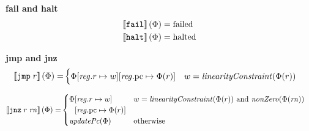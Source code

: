 \documentclass[a4paper]{article}
\begin{document}
\noindent\textbf{fail and halt}\\
\begin{align*}
  \left\llbracket \texttt{{\color{black} fail}} \right\rrbracket(\Phi) = & \; \mathrm{failed} \\
  \left\llbracket \texttt{{\color{black} halt}} \right\rrbracket(\Phi) = & \; \mathrm{halted}
\end{align*}

\noindent\textbf{jmp and jnz}\\
\begin{align*}
  \sem{\tjmp{r}}(\Phi) = &  
                     \begin{cases}
                       \Phi\updReg{r}{w}\updReg{\pcreg}{\Phi(r)} & w = \linCons{\Phi(r)}
                     \end{cases}
\end{align*}

\begin{align*}
  \sem{\tjnz{r}{\rn}}(\Phi) = &       
                             \begin{cases}
                               \arraycolsep=0pt
                               \begin{array}[t]{rl}
                                 \Phi&\updReg{r}{w}\\
                                     &\updReg{\pcreg}{\Phi(r)}
                               \end{array} 
                                              & w = \linCons{\Phi(r)} \tand \nonZero{\Phi(\rn)}\\
                               \updPcAddr{\Phi} & \totherwise
                             \end{cases}
\end{align*}
\end{document}
